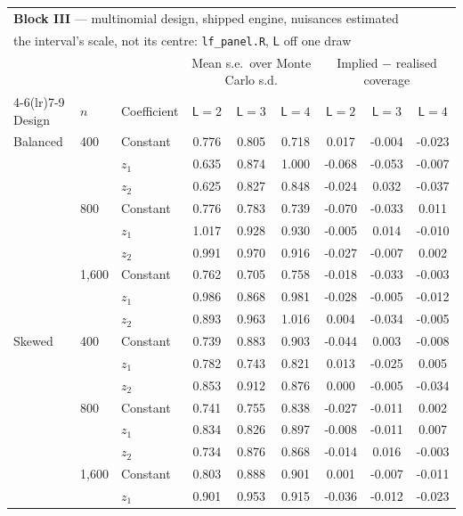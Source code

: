 \begin{tabular}{lllcccccc}
\toprule
\multicolumn{9}{l}{\textbf{Block III} --- multinomial design, shipped engine, nuisances estimated} \\
\multicolumn{9}{l}{\quad the interval's scale, not its centre: \texttt{lf\_panel.R}, $\mathsf L$ off one draw} \\
\midrule
& & & \multicolumn{3}{c}{Mean s.e.\ over Monte Carlo s.d.} & \multicolumn{3}{c}{Implied $-$ realised coverage} \\
\cmidrule(lr){4-6}\cmidrule(lr){7-9}
Design & $n$ & Coefficient & $\mathsf L=2$ & $\mathsf L=3$ & $\mathsf L=4$ & $\mathsf L=2$ & $\mathsf L=3$ & $\mathsf L=4$ \\
\midrule
Balanced & 400 & Constant & 0.776 & 0.805 & 0.718 & 0.017 & -0.004 & -0.023 \\
 &  & $z_1$ & 0.635 & 0.874 & 1.000 & -0.068 & -0.053 & -0.007 \\
 &  & $z_2$ & 0.625 & 0.827 & 0.848 & -0.024 & 0.032 & -0.037 \\
 & 800 & Constant & 0.776 & 0.783 & 0.739 & -0.070 & -0.033 & 0.011 \\
 &  & $z_1$ & 1.017 & 0.928 & 0.930 & -0.005 & 0.014 & -0.010 \\
 &  & $z_2$ & 0.991 & 0.970 & 0.916 & -0.027 & -0.007 & 0.002 \\
 & 1,600 & Constant & 0.762 & 0.705 & 0.758 & -0.018 & -0.033 & -0.003 \\
 &  & $z_1$ & 0.986 & 0.868 & 0.981 & -0.028 & -0.005 & -0.012 \\
 &  & $z_2$ & 0.893 & 0.963 & 1.016 & 0.004 & -0.034 & -0.005 \\
\addlinespace
Skewed & 400 & Constant & 0.739 & 0.883 & 0.903 & -0.044 & 0.003 & -0.008 \\
 &  & $z_1$ & 0.782 & 0.743 & 0.821 & 0.013 & -0.025 & 0.005 \\
 &  & $z_2$ & 0.853 & 0.912 & 0.876 & 0.000 & -0.005 & -0.034 \\
 & 800 & Constant & 0.741 & 0.755 & 0.838 & -0.027 & -0.011 & 0.002 \\
 &  & $z_1$ & 0.834 & 0.826 & 0.897 & -0.008 & -0.011 & 0.007 \\
 &  & $z_2$ & 0.734 & 0.876 & 0.868 & -0.014 & 0.016 & -0.003 \\
 & 1,600 & Constant & 0.803 & 0.888 & 0.901 & 0.001 & -0.007 & -0.011 \\
 &  & $z_1$ & 0.901 & 0.953 & 0.915 & -0.036 & -0.012 & -0.023 \\

\end{tabular}
